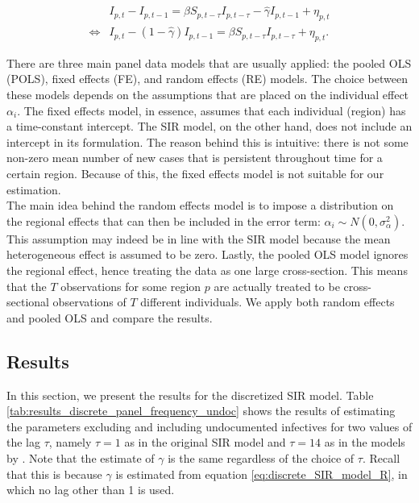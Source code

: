 \documentclass[12pt]{article}
\begin{document}
\begin{appendices}
    	    \begin{equation} \label{eq:discrete_SIR_model_I_twostep}
    	        \begin{split}
            		& I_{p,t} - I_{p,t-1} = \beta S_{p,t-\tau}I_{p,t-\tau} - \hat{\gamma} I_{p,t-1} + \eta_{p,t} \\
        	        \iff & I_{p,t} - \left(1 - \hat{\gamma}\right) I_{p,t-1} = \beta S_{p,t-\tau}I_{p,t-\tau} + \eta_{p,t}.
        		\end{split}
    	    \end{equation}
	
	    There are three main panel data models that are usually applied: the pooled OLS (POLS), fixed effects (FE), and random effects (RE) models. The choice between these models depends on the assumptions that are placed on the individual effect $\alpha_i$. The fixed effects model, in essence, assumes that each individual (region) has a time-constant intercept. The SIR model, on the other hand, does not include an intercept in its formulation. The reason behind this is intuitive: there is not some non-zero mean number of new cases that is persistent throughout time for a certain region. Because of this, the fixed effects model is not suitable for our estimation. \\
    	
    	The main idea behind the random effects model is to impose a distribution on the regional effects that can then be included in the error term: $\alpha_i \sim N\left(0, \sigma^2_{\alpha}\right)$. This assumption may indeed be in line with the SIR model because the mean heterogeneous effect is assumed to be zero. Lastly, the pooled OLS model ignores the regional effect, hence treating the data as one large cross-section. This means that the $T$ observations for some region $p$ are actually treated to be cross-sectional observations of $T$ different individuals. We apply both random effects and pooled OLS and compare the results.
	
	    \subsection{Results} \label{sapp:discrete_sir_results}
		In this section, we present the results for the discretized SIR model. Table \ref{tab:results_discrete_panel_frequency_undoc} shows the results of estimating the parameters excluding and including undocumented infectives for two values of the lag $\tau$, namely $\tau = 1$ as in the original SIR model and $\tau = 14$ as in the models by \textcite{adda2016economic}. Note that the estimate of $\gamma$ is the same regardless of the choice of $\tau$. Recall that this is because $\gamma$ is estimated from equation \eqref{eq:discrete_SIR_model_R}, in which no lag other than 1 is used.
	

\end{appendices}
\end{document}

